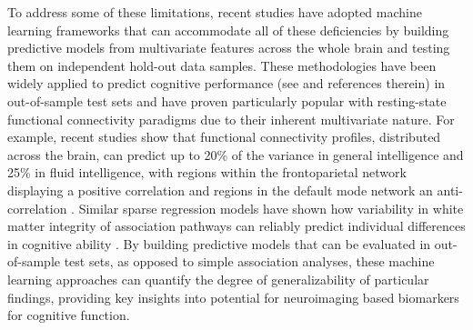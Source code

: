 \documentclass[10pt,letterpaper]{article}
\begin{document}
To address some of these limitations, recent studies have adopted machine learning frameworks that can accommodate all of these deficiencies by building predictive models from multivariate features across the whole brain and testing them on independent hold-out data samples. These methodologies have been widely applied to predict cognitive performance (see \cite{Sui2020} and references therein) in out-of-sample test sets and have proven particularly popular with resting-state functional connectivity paradigms due to their inherent multivariate nature. For example, recent studies show that functional connectivity profiles, distributed across the brain, can predict up to 20\% of the variance in general intelligence \cite{Dubois2018} and 25\% in fluid intelligence, with regions within the frontoparietal network displaying a positive correlation and regions in the default mode network an anti-correlation \cite{finn_functional_2015}. Similar sparse regression models have shown how variability in white matter integrity of association pathways can reliably predict individual differences in cognitive ability \cite{powell_local_2017}. By building predictive models that can be evaluated in out-of-sample test sets, as opposed to simple association analyses, these machine learning approaches can quantify the degree of generalizability of particular findings, providing key insights into potential for neuroimaging based biomarkers for cognitive function.  
\end{document}
